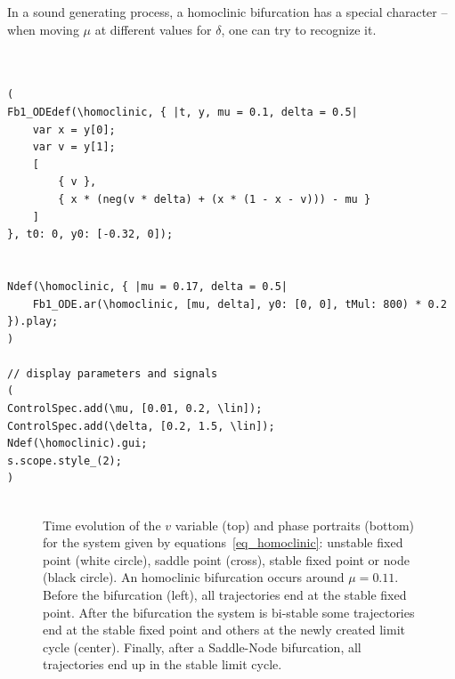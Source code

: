 \documentclass{article}
\begin{document}
In a sound generating process, a homoclinic bifurcation has a special  character -- when moving $\mu$ at different values for $\delta$, one can try to recognize it.


\begin{lstlisting}[frame=single,label=lst_homoclinic,caption=Exploring the sound of homoclinic bifurcation.]


(
Fb1_ODEdef(\homoclinic, { |t, y, mu = 0.1, delta = 0.5|
	var x = y[0];
	var v = y[1];
	[
		{ v },
		{ x * (neg(v * delta) + (x * (1 - x - v))) - mu }
	]
}, t0: 0, y0: [-0.32, 0]);


Ndef(\homoclinic, { |mu = 0.17, delta = 0.5|
	Fb1_ODE.ar(\homoclinic, [mu, delta], y0: [0, 0], tMul: 800) * 0.2
}).play;
)

// display parameters and signals
(
ControlSpec.add(\mu, [0.01, 0.2, \lin]);
ControlSpec.add(\delta, [0.2, 1.5, \lin]);
Ndef(\homoclinic).gui;
s.scope.style_(2);
)


\end{lstlisting}


\begin{figure}[h!]
    \centering
    \caption{Time evolution of the $v$ variable (top) and phase portraits (bottom) for the system given by equations~\ref{eq_homoclinic}:
    unstable fixed point (white circle), saddle point (cross), stable fixed point or node (black circle). An homoclinic bifurcation occurs around $\mu=0.11$. Before the bifurcation (left), all trajectories end at the stable fixed point. After the bifurcation the system is bi-stable some trajectories end at the stable fixed point and others at the newly created limit cycle (center). Finally, after a Saddle-Node bifurcation, all trajectories end up in the stable limit cycle.} 
    \label{fig_homoclinic}
\end{figure}
\end{document}
